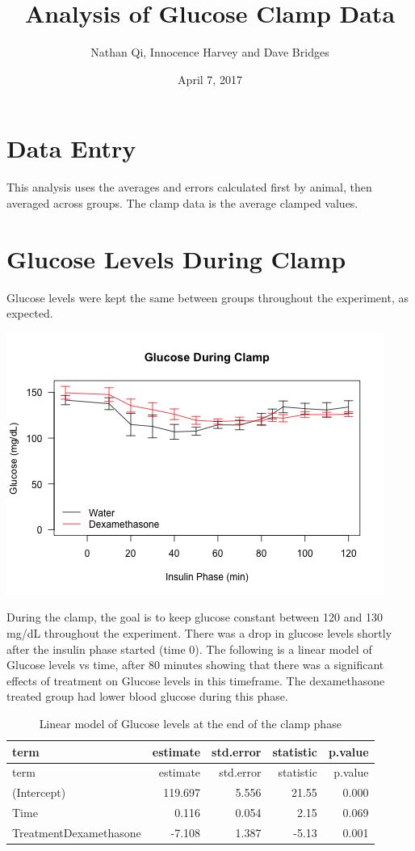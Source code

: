 \documentclass[]{article}
\title{Analysis of Glucose Clamp Data}
\author{Nathan Qi, Innocence Harvey and Dave Bridges}
\date{April 7, 2017}
\begin{document}
\maketitle

{
\setcounter{tocdepth}{2}
\tableofcontents
}
\section{Data Entry}\label{data-entry}

This analysis uses the averages and errors calculated first by animal,
then averaged across groups. The clamp data is the average clamped
values.

\section{Glucose Levels During Clamp}\label{glucose-levels-during-clamp}

Glucose levels were kept the same between groups throughout the
experiment, as expected.

\includegraphics{figures/glucose-time-course-1.png}

During the clamp, the goal is to keep glucose constant between 120 and
130 mg/dL throughout the experiment. There was a drop in glucose levels
shortly after the insulin phase started (time 0). The following is a
linear model of Glucose levels vs time, after 80 minutes showing that
there was a significant effects of treatment on Glucose levels in this
timeframe. The dexamethasone treated group had lower blood glucose
during this phase.

\begin{longtable}[]{@{}lrrrr@{}}
\caption{Linear model of Glucose levels at the end of the clamp
phase}\tabularnewline
\toprule
term & estimate & std.error & statistic & p.value\tabularnewline
\midrule
\endfirsthead
\toprule
term & estimate & std.error & statistic & p.value\tabularnewline
\midrule
\endhead
(Intercept) & 119.697 & 5.556 & 21.55 & 0.000\tabularnewline
Time & 0.116 & 0.054 & 2.15 & 0.069\tabularnewline
TreatmentDexamethasone & -7.108 & 1.387 & -5.13 & 0.001\tabularnewline
\bottomrule
\end{longtable}
\end{document}
